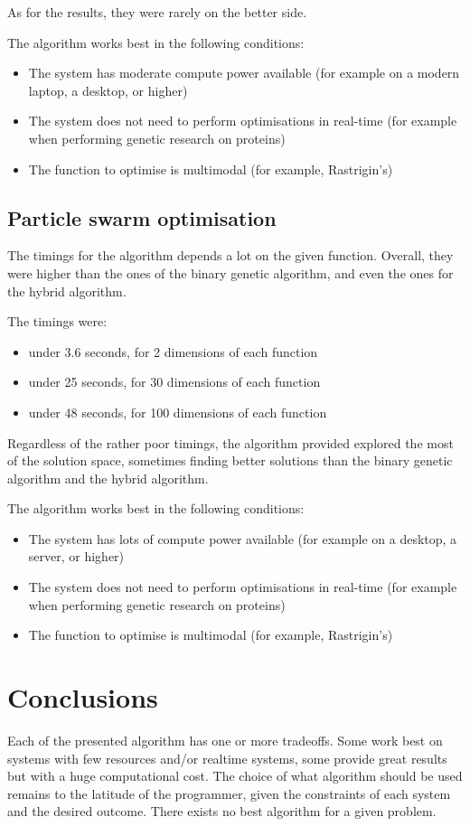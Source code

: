 \documentclass[conference]{IEEEtran}
\begin{document}
As for the results, they were rarely on the better side.

The algorithm works best in the following conditions:
\begin{itemize}
    \item The system has moderate compute power available (for example on a modern laptop, a desktop, or higher)
    \item The system does not need to perform optimisations in real-time (for example when performing genetic research on proteins)
    \item The function to optimise is multimodal (for example, Rastrigin's)
\end{itemize}

\subsection{Particle swarm optimisation}
The timings for the algorithm depends a lot on the given function. Overall, they were higher than the ones of the binary genetic
algorithm, and even the ones for the hybrid algorithm.

The timings were:
\begin{itemize}
    \item under 3.6 seconds, for 2 dimensions of each function
    \item under 25 seconds, for 30 dimensions of each function
    \item under 48 seconds, for 100 dimensions of each function
\end{itemize}

Regardless of the rather poor timings, the algorithm provided explored the most of the solution space, sometimes finding better
solutions than the binary genetic algorithm and the hybrid algorithm.

The algorithm works best in the following conditions:
\begin{itemize}
    \item The system has lots of compute power available (for example on a desktop, a server, or higher)
    \item The system does not need to perform optimisations in real-time (for example when performing genetic research on proteins)
    \item The function to optimise is multimodal (for example, Rastrigin's)
\end{itemize}

\section{Conclusions}
Each of the presented algorithm has one or more tradeoffs. Some work best on systems with few resources and/or realtime systems,
some provide great results but with a huge computational cost. The choice of what algorithm should be used remains to the
latitude of the programmer, given the constraints of each system and the desired outcome. There exists no best algorithm for
a given problem.
\end{document}

